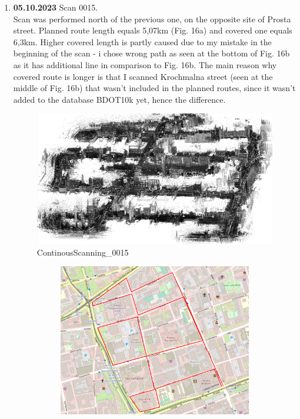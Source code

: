 \documentclass[a4paper,12pt]{book}
\begin{document}
\begin{enumerate}
	\item \textbf{05.10.2023} Scan 0015. \\
	Scan was performed north of the previous one, on the opposite site of Prosta street. Planned route length equals 5,07km (Fig. 16a) and covered one equals 6,3km. Higher covered length is partly caused due to my mistake in the beginning of the scan - i chose wrong path as seen at the bottom of Fig. 16b as it has additional line in comparison to Fig. 16b. The main reason why covered route is longer is that I scanned Krochmalna street (seen at the middle of Fig. 16b) that wasn't included in the planned routes, since it wasn't added to the database BDOT10k yet, hence the difference.
	\begin{figure}[H]
		\includegraphics[width=1\linewidth]{cloud15}
		\caption{ContinousScanning\_0015}
	\end{figure} 
	\begin{figure}[H]
		\centering
		\begin{subfigure}{.85\textwidth}
			\centering
			\includegraphics[width=1\linewidth]{route_p15}

\end{subfigure}
\end{figure}
\end{enumerate}
\end{document}

